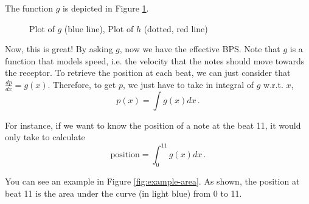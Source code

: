 \documentclass[a4paper,9pt]{article}
\begin{document}
    The function $g$ is depicted in Figure \ref{fig:beat2effective-bps}.
\begin{figure}[htpb]
	\centering

\caption{Plot of $g$ (blue line), Plot of $h$ (dotted, red line)}
	\label{fig:beat2effective-bps}
\end{figure}
Now, this is great! By asking $g$, now we have the effective BPS. Note that $g$ is a function that models speed, i.e. the velocity that the notes should move towards the receptor.
To retrieve the position at each beat, we can just consider that $\frac{dp}{dx} = g(x)$. Therefore, to get $p$, we just have to take in integral of $g$ w.r.t. $x$,
\begin{equation}
p(x) = \int g(x) dx\,.
	\label{eq:beat2position}
\end{equation}

For instance, if we want to know the position of a note at the beat 11, it would only take to calculate 
\begin{equation}
	\text{position} = \int_{0}^{11} g(x) dx\,.
	\label{eq:beat2position-example}
\end{equation}

You can see an example in Figure \ref{fig:example-area}. As shown, the position  at beat 11 is the area under the curve (in light blue) from 0 to 11.
\end{document}
